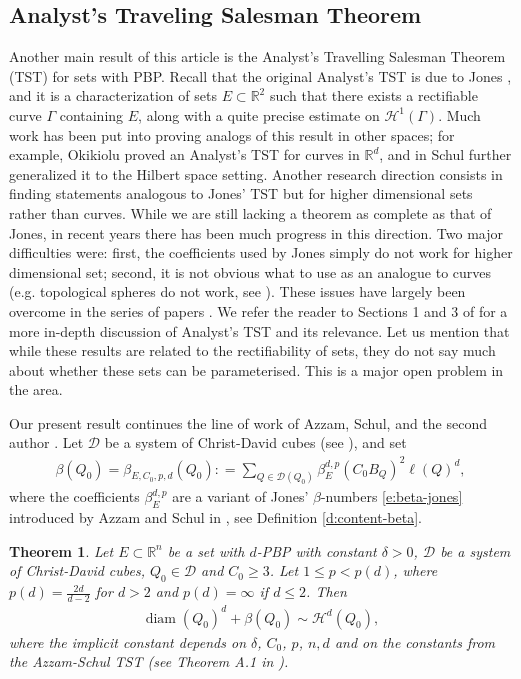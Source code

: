 \documentclass[11pt,reqno]{amsart}
\DeclareMathOperator{\diam}{diam}
\newtheorem{theorem}{Theorem}[section]
\theoremstyle{definition}
\theoremstyle{remark}
\numberwithin{equation}{section}
\newcommand{\R}{\mathbb{R}}
\newcommand{\hd}{\mathcal{H}^d}
\newcommand{\dD}{\mathcal{D}}
\newcommand{\dH}{\mathcal{H}}
\theoremstyle{theorem}
\theoremstyle{definition}
\theoremstyle{remark}
\numberwithin{equation}{section}
\begin{document}
	\subsection{Analyst's Traveling Salesman Theorem}
%
%
%
%
%
%
	Another main result of this article is the {Analyst's Travelling Salesman Theorem (TST) for sets with PBP}. Recall that the original Analyst's TST is due to Jones \cite{jones1990rectifiable}, and it is a characterization of sets $E\subset\R^2$ such that there exists a rectifiable curve $\Gamma$ containing $E$, along with a quite precise estimate on $\dH^1(\Gamma)$. Much work has been put into proving analogs of this result in other spaces; for example, Okikiolu \cite{okikiolu1992characterization} proved an Analyst's TST for curves in $\R^d$, and in \cite{schul2007subsets} Schul further generalized it to the Hilbert space setting. Another research direction consists in finding statements analogous to Jones' TST but for higher dimensional sets rather than curves. %
	While we are still lacking a theorem as complete as that of Jones, in recent years there has been much progress in this direction. Two major difficulties were: first, the coefficients used by Jones simply do not work for higher dimensional set; second, it is not obvious what to use as an analogue to curves (e.g. topological spheres do not work, see \cite[Introduction]{villa2019higher}). These issues have largely been overcome in the series of papers \cite{azzam2018analyst,azzam2019quantitative,villa2019higher,hyde2020ddimensional,hyde2021d}.  We refer the reader to Sections 1 and 3 of \cite{villa2019higher} for a more in-depth discussion of Analyst's TST and its relevance. Let us mention that while these results are related to the rectifiability of sets, they do not say much about whether these sets can be parameterised. This is a major open problem in the area.
	
	Our present result continues the line of work of Azzam, Schul, and the second author \cite{azzam2018analyst,azzam2019quantitative}. Let $\dD$ be a system of Christ-David cubes (see ), and set 
	\begin{align}\label{e:BETA}
	\beta(Q_0) = \beta_{E, C_0, p, d} (Q_0): = \sum_{Q \in \dD(Q_0)} \beta_E^{d,p} (C_0 B_Q)^2 \ell(Q)^d,
	\end{align}
	where the coefficients $\beta_E^{d,p}$ are a variant of Jones' $\beta$-numbers \eqref{e:beta-jones} introduced by Azzam and Schul in \cite{azzam2018analyst}, see Definition \ref{d:content-beta}.
	
	\begin{theorem}\label{t:main}
		Let $E\subset \R^n$ be a set with $d$-PBP with constant $\delta>0$, $\dD$ be a system of Christ-David cubes, $Q_0 \in \dD$ and $C_0\geq 3$. Let $1 \leq p < p(d)$, where $p(d)=\tfrac{2d}{d-2}$ for $d>2$ and $p(d)=\infty$ if $d\le 2$.
		Then
		\begin{align}\label{e:main}
			\diam(Q_0)^d + \beta(Q_0) \sim \hd(Q_0),
		\end{align}
		where the implicit constant depends on $\delta$, $C_0$, $p$, $n,d$ and on the constants from the Azzam-Schul TST \textup{(}see Theorem A.1 in \cite{azzam2019quantitative}\textup{)}.
	\end{theorem}	
	
\end{document}
